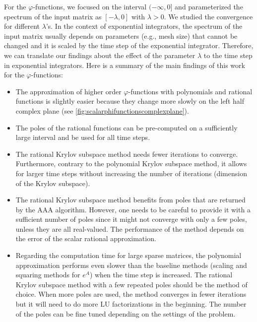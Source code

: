 For the $\varphi$-functions, we focused on the interval $(-\infty, 0]$ and parameterized
the spectrum of the input matrix as $[-\lambda, 0]$ with $\lambda > 0$. We studied the
convergence for different $\lambda$'s.
In the context of exponential integrators, the spectrum of the input matrix usually
depends on parameters (e.g., mesh size) that cannot be changed and it is scaled by the
time step of the exponential integrator.
Therefore, we can translate our findings about the effect of the parameter $\lambda$ to
the time step in exponential integrators.
Here is a summary of the main findings of this work for the $\varphi$-functions:
\begin{itemize}
    \item The approximation of higher order $\varphi$-functions with polynomials
        and rational functions is slightly easier because they change more slowly
        on the left half complex plane (see \autoref{fig:scalarphifunctionscomplexplane}).
    \item The poles of the rational functions can be pre-computed on a sufficiently
        large interval and be used for all time steps.
    \item The rational Krylov subspace method needs fewer iterations to converge.
        Furthermore, contrary to the polynomial Krylov subspace method, it allows for
        larger time steps without increasing the number of iterations
        (dimension of the Krylov subspace).
    \item The rational Krylov subspace method benefits from poles that are returned by
        the AAA algorithm.
        However, one needs to be careful to provide it with a sufficient number of poles
        since it might not converge with only a few poles, unless they are all real-valued.
        The performance of the method depends on the error of the scalar rational
        approximation.
    \item Regarding the computation time for large sparse matrices, the polynomial
        approximation performs even slower than the baseline methods
        (scaling and squaring methods for $e^A$) when the time step is increased.
        The rational Krylov subspace method with a few repeated poles should
        be the method of choice.
        When more poles are used, the method converges in fewer iterations but it will
        need to do more LU factorizations in the beginning. The number of the poles can be
        fine tuned depending on the settings of the problem.
\end{itemize}


